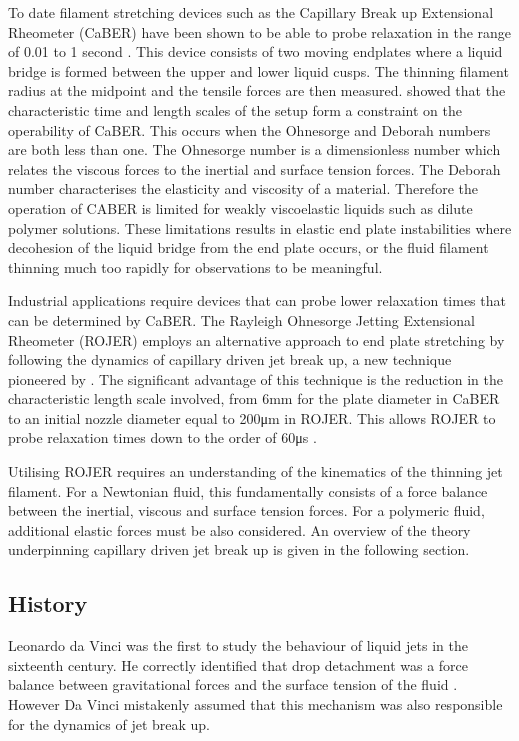 \documentclass[11pt]{article}
\begin{document}
To date filament stretching devices such as the Capillary Break up Extensional 
Rheometer (CaBER) have been shown to be able to probe relaxation in the range 
of 0.01 to 1 second \citep{bazilevsky1990liquid}. This device consists of two 
moving endplates where a liquid bridge is formed between the upper and lower 
liquid cusps. The thinning filament radius at the midpoint and the tensile 
forces are then measured. \cite{rodd2004capillary} showed that the 
characteristic time and length scales of the setup form a constraint on the 
operability of CaBER. This occurs when the Ohnesorge and Deborah numbers are 
both less than one. The Ohnesorge number is a dimensionless number which 
relates the viscous forces to the inertial and surface tension forces. The 
Deborah number characterises the elasticity and viscosity of a material. 
Therefore the operation of CABER is limited for weakly viscoelastic liquids 
such as dilute polymer solutions. These limitations results in elastic end 
plate instabilities where decohesion of the liquid bridge from the end plate 
occurs, or the fluid filament thinning much too rapidly for observations to be 
meaningful. 

Industrial applications require devices that can probe lower relaxation times 
that can be determined by CaBER. The Rayleigh Ohnesorge Jetting Extensional 
Rheometer (ROJER) employs an alternative approach to end plate stretching by 
following the dynamics of capillary driven jet break up, a new technique 
pioneered by \cite{keshavarz2015studying}. The significant advantage of this 
technique is the reduction in the characteristic length scale involved, from 
6mm for the plate diameter in CaBER to an initial nozzle diameter equal to 
200μm in ROJER. This allows ROJER to probe relaxation times down to the order 
of 60μs \citep{keshavarz2015studying}.

Utilising ROJER requires an understanding of the kinematics of the thinning jet 
filament. For a Newtonian fluid, this fundamentally consists of a force balance 
between the inertial, viscous and surface tension forces. For a polymeric 
fluid, additional elastic forces must be also considered. An overview of the 
theory underpinning capillary driven jet break up is given in the following 
section.

\subsection{History}
Leonardo da Vinci was the first to study the behaviour of liquid jets in the 
sixteenth century. He correctly identified that drop detachment was a force 
balance between gravitational forces and the surface tension of the fluid 
\citep{da1999codex}. However Da Vinci mistakenly assumed that this mechanism 
was also responsible for the dynamics of jet break up.
\end{document}

